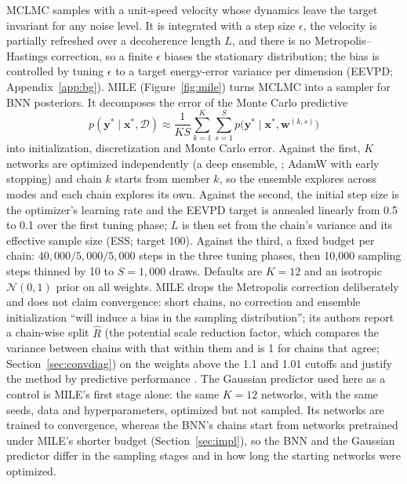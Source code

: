 \documentclass[11pt]{article}
\begin{document}
MCLMC \citep{robnik2024mclmc} samples with a unit-speed velocity whose dynamics leave the target invariant for any noise
level. It is integrated with a step size $\epsilon$, the velocity is partially refreshed over a decoherence length $L$,
and there is no Metropolis--Hastings correction, so a finite $\epsilon$ biases the stationary distribution; the bias is
controlled by tuning $\epsilon$ to a target energy-error variance per dimension (EEVPD; Appendix~\ref{app:bg}).
MILE \citep{sommer2025mile} (Figure~\ref{fig:mile}) turns MCLMC into a sampler for BNN posteriors. It decomposes the
error of the Monte Carlo predictive
\begin{equation}
\label{eq:mc_predictive}
p(\mathbf{y}^\ast\mid\mathbf{x}^\ast,\mathcal{D})\approx\frac{1}{KS}\sum_{k=1}^{K}\sum_{s=1}^{S}
p\big(\mathbf{y}^\ast\mid\mathbf{x}^\ast,\mathbf w^{(k,s)}\big)
\end{equation}
into initialization, discretization and Monte Carlo error. Against the first, $K$ networks are optimized independently
(a deep ensemble, \citealp{lakshminarayanan2017ensembles}; AdamW with early stopping) and chain $k$ starts from member
$k$, so the ensemble explores across modes and each chain explores its own. Against the second, the initial step size is
the optimizer's learning rate and the EEVPD target is annealed linearly from 0.5 to 0.1 over the first tuning phase;
$L$ is then set from the chain's variance and its effective sample size (ESS; target 100). Against the third, a fixed budget
per chain: $40{,}000/5{,}000/5{,}000$ steps in the three tuning phases, then 10{,}000 sampling steps thinned by 10 to
$S=1{,}000$ draws. Defaults are $K=12$ and an isotropic $\mathcal{N}(0,1)$ prior on all weights. MILE drops the Metropolis
correction deliberately and does not claim convergence: short chains, no correction and ensemble initialization ``will
induce a bias in the sampling distribution''; its authors report a chain-wise split $\widehat R$ (the potential scale reduction factor, which compares the
variance between chains with that within them and is 1 for chains that agree; Section~\ref{sec:convdiag}) on the
weights above
the 1.1 and 1.01 cutoffs and justify the method by predictive performance \citep[App.~A.3]{sommer2025mile}.
The Gaussian predictor used here as a control is MILE's first stage alone: the same $K=12$ networks, with the same
seeds, data and hyperparameters, optimized but not sampled. Its networks are trained to convergence, whereas the BNN's
chains start from networks pretrained under MILE's shorter budget (Section~\ref{sec:impl}), so the BNN and the Gaussian
predictor differ in the sampling stages and in how long the starting networks were optimized.
\end{document}
